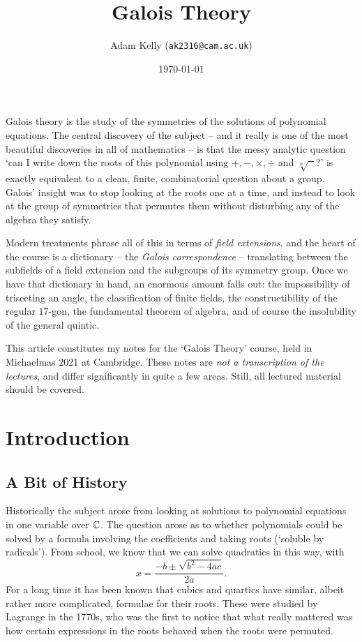 \documentclass[a4paper]{scrartcl}
\title{Galois Theory}
\author{Adam Kelly (\texttt{ak2316@cam.ac.uk})}
\date{\today}
\begin{document}
\maketitle

Galois theory is the study of the symmetries of the solutions of polynomial equations. The central discovery of the subject -- and it really is one of the most beautiful discoveries in all of mathematics -- is that the messy analytic question `can I write down the roots of this polynomial using $+, -, \times, \div$ and $\sqrt[n]{\phantom{x}}$?' is exactly equivalent to a clean, finite, combinatorial question about a group. Galois' insight was to stop looking at the roots one at a time, and instead to look at the group of symmetries that permutes them without disturbing any of the algebra they satisfy.

Modern treatments phrase all of this in terms of \emph{field extensions}, and the heart of the course is a dictionary -- the \emph{Galois correspondence} -- translating between the subfields of a field extension and the subgroups of its symmetry group. Once we have that dictionary in hand, an enormous amount falls out: the impossibility of trisecting an angle, the classification of finite fields, the constructibility of the regular $17$-gon, the fundamental theorem of algebra, and of course the insolubility of the general quintic.

This article constitutes my notes for the `Galois Theory' course, held in Michaelmas 2021 at Cambridge. These notes are \emph{not a transcription of the lectures}, and differ significantly in quite a few areas. Still, all lectured material should be covered.

\tableofcontents

\section{Introduction}

\subsection{A Bit of History}

Historically the subject arose from looking at solutions to polynomial equations in one variable over $\mathbb{C}$. The question arose as to whether polynomials could be solved by a formula involving the coefficients and taking roots (`soluble by radicals'). From school, we know that we can solve quadratics in this way, with
$$x = \frac{-b \pm \sqrt{b^2 - 4ac}}{2a}.$$
For a long time it has been known that cubics and quartics have similar, albeit rather more complicated, formulae for their roots. These were studied by Lagrange in the 1770s, who was the first to notice that what really mattered was how certain expressions in the roots behaved when the roots were permuted.
\end{document}

